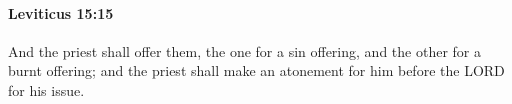 
		\paragraph{Leviticus 15:15} %
			\label{LEVITICUS-15-15}

			And the priest shall offer them, the one for a sin offering, and the other for a burnt offering; and the priest shall make an atonement for him before the LORD for his issue.


